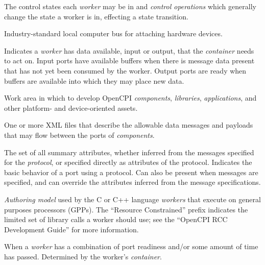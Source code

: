 \begin{description}[style=nextline]

\item[Lifecycle Model]
The control states each \textit{worker} may be in and \textit{control operations} which generally change the state a worker is in, effecting a state transition.


\item[PCI (Peripheral Component Interconnect)]
Industry-standard local computer bus for attaching hardware devices.

\item[Port Readiness]
Indicates a \textit{worker} has data available, input or output, that the \textit{container} needs to act on. Input ports have available buffers when there is message data present that has not yet been consumed by the worker. Output ports are ready when buffers are available into which they may place new data.

\item[Project]
Work area in which to develop OpenCPI \textit{components}, \textit{libraries}, \textit{applications}, and other platform- and device-oriented assets.

\item[Protocol Specification]
One or more XML files that describe the allowable data messages and payloads that may flow between the ports of \textit{components}.

\item[Protocol Summary]
The set of all summary attributes, whether inferred from the messages specified for the \textit{protocol}, or specified directly as attributes of the protocol. Indicates the basic behavior of a port using a protocol.  Can also be present when messages are specified, and can override the attributes inferred from the message specifications.

\item[RCC Authoring Model]
\textit{Authoring model} used by the C or C++ language \textit{workers} that execute on general purposes processors (GPPs). The ``Resource Constrained'' prefix indicates the limited set of library calls a worker should use; see the ``OpenCPI RCC Development Guide'' for more information.

\item[Run Condition]
When a \textit{worker} has a combination of port readiness and/or some amount of time has passed. Determined by the worker's \textit{container}.


\end{description}
